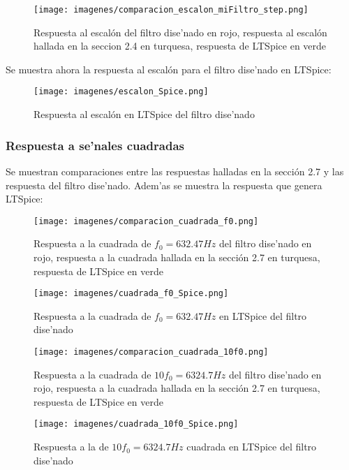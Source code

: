 \documentclass[12pt, titlepage]{article}
\begin{document}
    \begin{figure}[!htb]
    \texttt{[image: imagenes/comparacion\_escalon\_miFiltro\_step.png]}
    \centering
    \caption{Respuesta al escalón del filtro dise'nado en rojo, respuesta al escalón hallada en la seccion 2.4 en turquesa, respuesta de LTSpice en verde}
    \end{figure}
    
    Se muestra ahora la respuesta al escalón para el filtro dise'nado en LTSpice:
    \begin{figure}[!htb]
    \texttt{[image: imagenes/escalon\_Spice.png]}
    \centering
    \caption{Respuesta al escalón en LTSpice del filtro dise'nado}
    \end{figure}
    
    
    \subsubsection{Respuesta a se'nales cuadradas}
    
    Se muestran comparaciones entre las respuestas halladas en la sección 2.7 y las respuesta del filtro dise'nado. Adem'as se muestra la respuesta que genera LTSpice:
    
    \begin{figure}[!htb]
    \texttt{[image: imagenes/comparacion\_cuadrada\_f0.png]}
    \centering
    \caption{Respuesta a la cuadrada de $f_0 = 632.47Hz$ del filtro dise'nado en rojo, respuesta a la cuadrada hallada en la sección 2.7 en turquesa, respuesta de LTSpice en verde}
    \end{figure}
    
    \begin{figure}[!htb]
    \texttt{[image: imagenes/cuadrada\_f0\_Spice.png]}
    \centering
    \caption{Respuesta a la cuadrada de $f_0 = 632.47Hz$ en LTSpice del filtro dise'nado}
    \end{figure}
    
    \newpage
    
    \begin{figure}[!htb]
    \texttt{[image: imagenes/comparacion\_cuadrada\_10f0.png]}
    \centering
    \caption{Respuesta a la cuadrada de $10f_0 = 6324.7Hz$ del filtro dise'nado en rojo, respuesta a la cuadrada hallada en la sección 2.7 en turquesa, respuesta de LTSpice en verde}
    \end{figure}
    
    \begin{figure}[!htb]
    \texttt{[image: imagenes/cuadrada\_10f0\_Spice.png]}
    \centering
    \caption{Respuesta a la de $10f_0 = 6324.7Hz$ cuadrada en LTSpice del filtro dise'nado}
    \end{figure}
    
\end{document}
